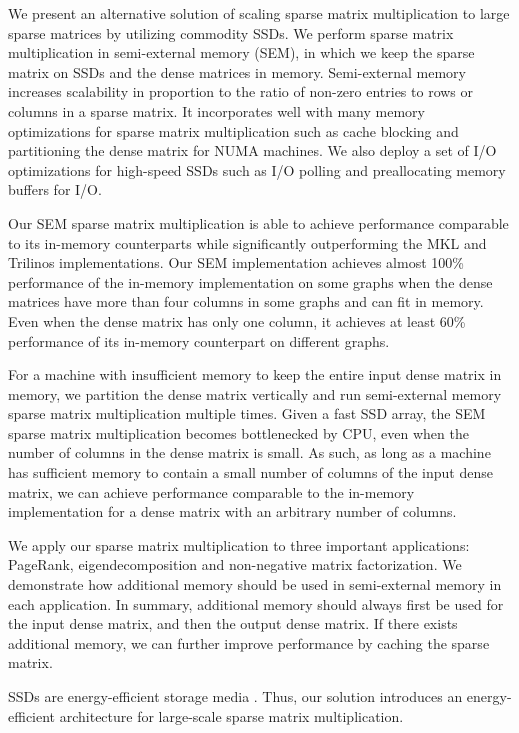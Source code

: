 We present an alternative solution of scaling sparse matrix multiplication
to large sparse matrices by utilizing commodity SSDs.
We perform sparse matrix multiplication in semi-external memory (SEM), in which
we keep the sparse matrix on SSDs and the dense matrices in memory. Semi-external
memory increases scalability in proportion to the ratio of non-zero entries
to rows or columns in a sparse matrix. It incorporates well with many memory
optimizations for sparse matrix
multiplication such as cache blocking and partitioning the dense matrix for
NUMA machines. We also deploy a set of I/O optimizations for high-speed SSDs
such as I/O polling and preallocating memory buffers for I/O.

Our SEM sparse matrix multiplication is able to achieve performance
comparable to its in-memory counterparts while significantly outperforming
the MKL and Trilinos implementations. Our SEM implementation achieves almost
100\% performance of the in-memory implementation on some graphs when
the dense matrices have more than four columns in some graphs and can fit
in memory. Even when the dense matrix has only one column, it achieves at least
60\% performance of its in-memory counterpart on different
graphs.

For a machine with insufficient memory
to keep the entire input dense matrix in memory, we partition the dense matrix
vertically and run semi-external memory sparse matrix multiplication multiple
times. Given a fast SSD array, the SEM sparse matrix multiplication becomes
bottlenecked by CPU, even when the number of columns in the dense matrix
is small. As such, as long as a machine has sufficient memory to contain
a small number of columns of the input dense matrix, we can achieve performance
comparable to the in-memory implementation for a dense matrix with an arbitrary
number of columns.

We apply our sparse matrix multiplication to three important applications:
PageRank, eigendecomposition and non-negative matrix factorization. We demonstrate
how additional memory should be used in semi-external memory in each application.
In summary, additional memory should always first be used for the input dense
matrix, and then the output dense matrix. If there exists additional memory,
we can further improve performance by caching the sparse matrix.

SSDs are energy-efficient storage media \cite{}. Thus, our solution introduces
an energy-efficient architecture for large-scale sparse matrix multiplication.
